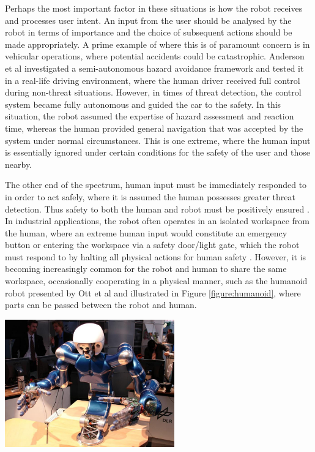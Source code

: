 \documentclass[11pt]{article}
\begin{document}
Perhaps the most important factor in these situations is how the robot receives and processes user intent. An input from the user should be analysed by the robot in terms of importance and the choice of subsequent actions should be made appropriately. A prime example of where this is of paramount concern is in vehicular operations, where potential accidents could be catastrophic. Anderson et al \cite{Anderson2010} investigated a semi-autonomous hazard avoidance framework and tested it in a real-life driving environment, where the human driver received full control during non-threat situations. However, in times of threat detection, the control system became fully autonomous and guided the car to the safety. In this situation, the robot assumed the expertise of hazard assessment and reaction time, whereas the human provided general navigation that was accepted by the system under normal circumstances. This is one extreme, where the human input is essentially ignored under certain conditions for the safety of the user and those nearby. 

The other end of the spectrum, human input must be immediately responded to in order to act safely, where it is assumed the human possesses greater threat detection. Thus safety to both the human and robot must be positively ensured \cite{Haddadin2007}. In industrial applications, the robot often operates in an isolated workspace from the human, where an extreme human input would constitute an emergency button or entering the workspace via a safety door/light gate, which the robot must respond to by halting all physical actions for human safety \cite{ISOGuards}. However, it is becoming increasingly common for the robot and human to share the same workspace, occasionally cooperating in a physical manner, such as the humanoid robot presented by Ott et al \cite{Ott2006} and illustrated in Figure \ref{figure:humanoid}, where parts can be passed between the robot and human.

\begin{center}
\includegraphics[width=0.55\textwidth]{humanoid.png}
\label{figure:humanoid}
\end{center}
\end{document}
